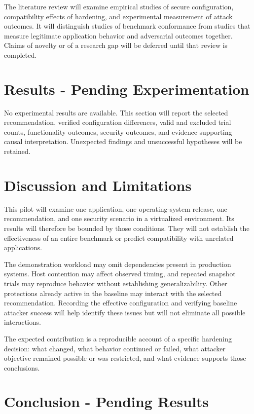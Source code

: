 \documentclass[12pt,letterpaper]{article}
\begin{document}
The literature review will examine empirical studies of secure configuration, compatibility effects of hardening, and experimental measurement of attack outcomes. It will distinguish studies of benchmark conformance from studies that measure legitimate application behavior and adversarial outcomes together. Claims of novelty or of a research gap will be deferred until that review is completed.
\section{Results - Pending Experimentation}
\label{sec:org39bc6ff}

No experimental results are available. This section will report the selected recommendation, verified configuration differences, valid and excluded trial counts, functionality outcomes, security outcomes, and evidence supporting causal interpretation. Unexpected findings and unsuccessful hypotheses will be retained.
\section{Discussion and Limitations}
\label{sec:org4601877}

This pilot will examine one application, one operating-system release, one recommendation, and one security scenario in a virtualized environment. Its results will therefore be bounded by those conditions. They will not establish the effectiveness of an entire benchmark or predict compatibility with unrelated applications.

The demonstration workload may omit dependencies present in production systems. Host contention may affect observed timing, and repeated snapshot trials may reproduce behavior without establishing generalizability. Other protections already active in the baseline may interact with the selected recommendation. Recording the effective configuration and verifying baseline attacker success will help identify these issues but will not eliminate all possible interactions.

The expected contribution is a reproducible account of a specific hardening decision: what changed, what behavior continued or failed, what attacker objective remained possible or was restricted, and what evidence supports those conclusions.
\section{Conclusion - Pending Results}
\label{sec:org03acdcc}
\end{document}
